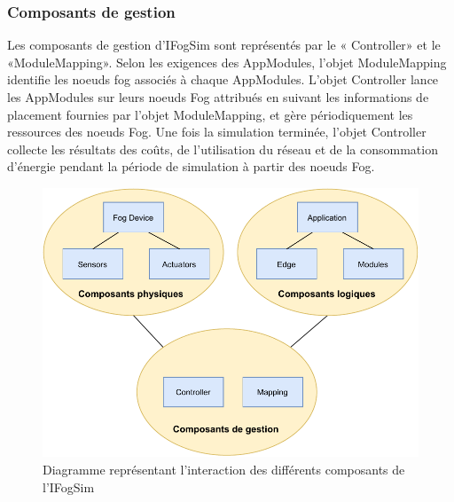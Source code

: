 \subsubsection{Composants de gestion}
Les composants de gestion d’IFogSim sont représentés par le « Controller» et le «ModuleMapping». Selon les exigences des AppModules, l'objet ModuleMapping identifie les noeuds fog associés à chaque AppModules. L'objet Controller lance les AppModules sur leurs noeuds Fog attribués en suivant les informations de placement fournies par l'objet ModuleMapping, et gère périodiquement les ressources des noeuds Fog. Une fois la simulation terminée, l'objet Controller collecte les résultats des coûts, de l'utilisation du réseau et de la consommation d'énergie pendant la période de simulation à partir des noeuds Fog.
\begin{figure}[H]
    \centering
    \includegraphics[]{src/ressources/Diagramme d'interaction.pdf}
    \caption{Diagramme représentant l'interaction des différents composants de l'IFogSim}
    \label{fig:}
\end{figure}
